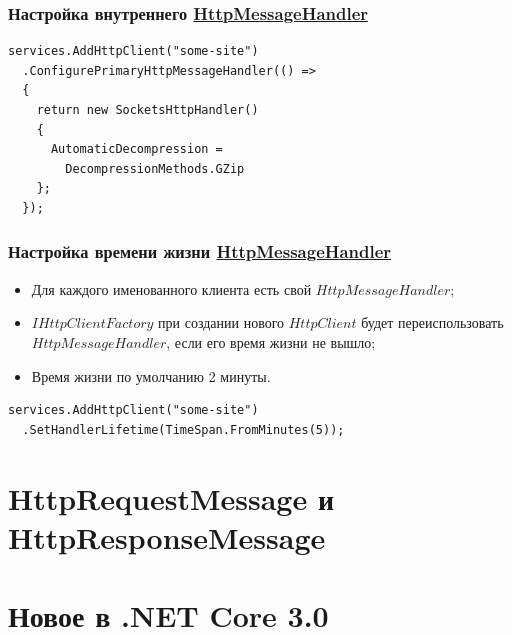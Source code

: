 \documentclass{beamer}
\begin{document}
\begin{frame}[fragile]
\frametitle{Настройка внутреннего \href{https://docs.microsoft.com/en-us/dotnet/api/system.net.http.socketshttphandler?view=netcore-2.2}{HttpMessageHandler}}
\begin{lstlisting}
services.AddHttpClient("some-site")
  .ConfigurePrimaryHttpMessageHandler(() =>
  {
    return new SocketsHttpHandler()
    {
      AutomaticDecompression = 
        DecompressionMethods.GZip
    };
  });
\end{lstlisting}
\end{frame}

\begin{frame}[fragile]
\frametitle{Настройка времени жизни \href{https://docs.microsoft.com/en-us/dotnet/api/system.net.http.socketshttphandler?view=netcore-2.2}{HttpMessageHandler}}
\begin{itemize}
\item Для каждого именованного клиента есть свой $HttpMessageHandler$;
\item $IHttpClientFactory$ при создании нового $HttpClient$ будет переиспользовать $HttpMessageHandler$, если его время жизни не вышло;
\item Время жизни по умолчанию 2 минуты.
\end{itemize}
\begin{lstlisting}
services.AddHttpClient("some-site")
  .SetHandlerLifetime(TimeSpan.FromMinutes(5));
\end{lstlisting}
\end{frame}


\section{HttpRequestMessage и HttpResponseMessage}
\begin{frame}
\end{frame}

\section{Новое в .NET Core 3.0}
\begin{frame}
\end{frame}
\end{document}
